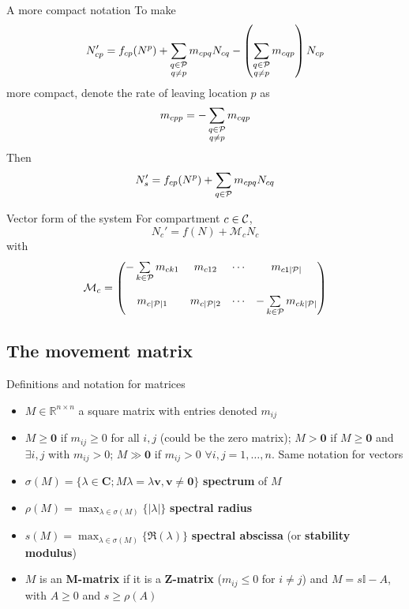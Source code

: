 \documentclass[aspectratio=43]{beamer}
\begin{document}
\begin{frame}{A more compact notation}
	To make 
	\[
		N_{cp}'=f_{cp}(N^p)
		+\sum\dind{q\in\P}{q\neq p}m_{cpq}N_{cq} 
		-\left(\sum\dind{q\in\P}{q\neq p}m_{cqp}\right)N_{cp}
	\]
	more compact, denote the rate of leaving location $p$ as
	\begin{equation}
		m_{cpp} = -\sum\dind{q\in\P}{q\neq p}m_{cqp}
	\end{equation}
	Then
	\begin{equation}\label{eq:general_metapop_linear_migration}
		N_s'=f_{cp}(N^p)+\sum_{q\in\P}m_{cpq}N_{cq}
	\end{equation}
\end{frame}

\begin{frame}{Vector form of the system}
For compartment $c\in\C$,
\begin{equation}\label{eq:general_metapop}
N_c'=f(N)+\mathcal{M}_cN_c
\end{equation}
with
\begin{equation}\label{eq:movement_matrix}
\mathcal{M}_c =
\begin{pmatrix}
-\sum\limits_{k\in\P}m_{ck1} & m_{c12} & \cdots & m_{c1|\P|} \\
& & & \\
m_{c|\P|1} & m_{c|\P|2} & \cdots & -\sum\limits_{k\in\P}m_{ck|\P|}
\end{pmatrix}
\end{equation}
\end{frame}


\subsection{The movement matrix}

\begin{frame}{Definitions and notation for matrices}
\begin{itemize}
	\item $M\in\mathbb{R}^{n\times n}$ a square matrix with entries denoted $m_{ij}$
	\vfill
	\item $M\geq\mathbf{0}$ if $m_{ij}\geq 0$ for all $i,j$ (could be the zero matrix); $M>\mathbf{0}$ if $M\geq\mathbf{0}$ and $\exists i,j$ with $m_{ij}>0$; $M\gg\mathbf{0}$ if $m_{ij}>0$ $\forall i,j=1,\ldots,n$. Same notation for vectors
	\vfill
	\item $\sigma(M)=\{\lambda\in\mathbf{C}; M\lambda=\lambda\mathbf{v}, \mathbf{v}\neq\mathbf{0}\}$ \textbf{spectrum} of $M$
	\vfill
	\item $\rho(M)=\max_{\lambda\in\sigma(M)}\{|\lambda|\}$ \textbf{spectral radius}
	\vfill
	\item $s(M)=\max_{\lambda\in\sigma(M)}\{\Re(\lambda)\}$ \textbf{spectral abscissa} (or \textbf{stability modulus})
	\vfill
	\item $M$ is an \textbf{M-matrix} if it is a \textbf{Z-matrix} ($m_{ij}\leq 0$ for $i\neq j$) and $M = s\mathbb{I}-A$, with $A\geq 0$ and $s\geq \rho(A)$
\end{itemize}
\end{frame}
\end{document}
